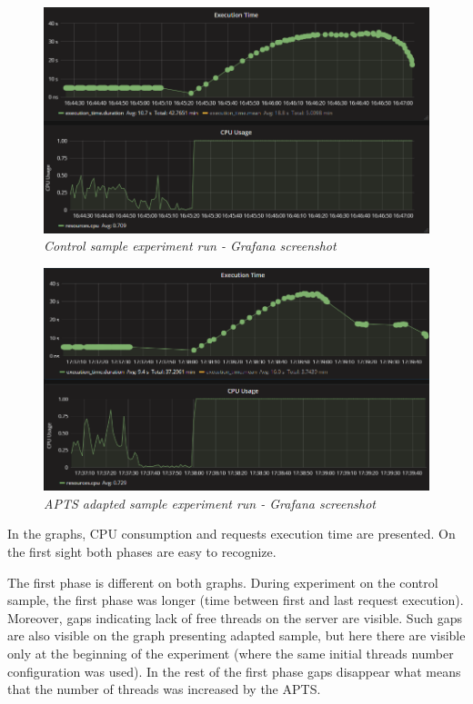 \documentclass[12pt,a4paper]{article}
\begin{document}
\begin{figure}[!htb]
\centering
\includegraphics[width=1\textwidth]{threadsCtrl}
\caption{\textit{Control sample experiment run - Grafana screenshot}} \label{figure:threads:screen:control}
\end{figure}
\begin{figure}[!htb]
\centering
\includegraphics[width=1\textwidth]{threadsEval}
\caption{\textit{APTS adapted sample experiment run - Grafana screenshot}} \label{figure:threads:screen:adapted}
\end{figure}

In the graphs, CPU consumption and requests execution time are presented. On the first sight both phases are easy to recognize.

The first phase is different on both graphs. During experiment on the control sample, the first phase was longer (time between first and last request execution). Moreover, gaps indicating lack of free threads on the server are visible. Such gaps are also visible on the graph presenting adapted sample, but here there are visible only at the beginning of the experiment (where the same initial threads number configuration was used). In the rest of the first phase gaps disappear what means that the number of threads was increased by the APTS. 
\end{document}
